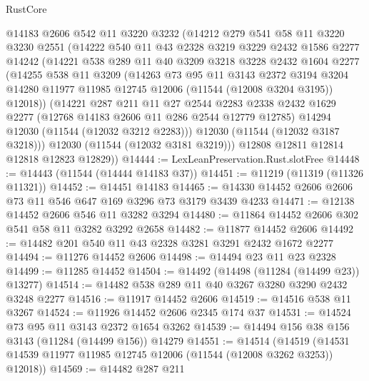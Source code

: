\begin{lexlean}{RustCore}
\begin{coremodule}
      @14183
      @2606
      @542
      @11
      @3220
      @3232
      (@14212
        @279
        @541
        @58
        @11
        @3220
        @3230
        @2551
        (@14222
          @540
          @11
          @43
          @2328
          @3219
          @3229
          @2432
          @1586
          @2277
          @14242
          (@14221
            @538
            @289
            @11
            @40
            @3209
            @3218
            @3228
            @2432
            @1604
            @2277
            (@14255
              @538
              @11
              @3209
              (@14263
                @73
                @95
                @11
                @3143
                @2372
                @3194
                @3204
                @14280
                @11977
                @11985
                @12745
                @12006
                (@11544 (@12008 @3204 @3195))
                @12018))
            (@14221
              @287
              @211
              @11
              @27
              @2544
              @2283
              @2338
              @2432
              @1629
              @2277
              (@12768 @14183 @2606 @11 @286 @2544 @12779 @12785)
              @14294
              @12030
              (@11544 (@12032 @3212 @2283)))
            @12030
            (@11544 (@12032 @3187 @3218)))
          @12030
          (@11544 (@12032 @3181 @3219)))
        @12808
        @12811
        @12814
        @12818
        @12823
        @12829))
@14444 := LexLeanPreservation.Rust.slotFree
@14448 := @14443 (@11544 (@14444 @14183 @37))
@14451 := @11219 (@11319 (@11326 @11321))
@14452 := @14451 @14183
@14465 := @14330 @14452 @2606 @2606 @73 @11 @546 @647 @169 @3296 @73 @3179 @3439 @4233
@14471 := @12138 @14452 @2606 @546 @11 @3282 @3294
@14480 := @11864 @14452 @2606 @302 @541 @58 @11 @3282 @3292 @2658
@14482 := @11877 @14452 @2606
@14492 := @14482 @201 @540 @11 @43 @2328 @3281 @3291 @2432 @1672 @2277
@14494 := @11276 @14452 @2606
@14498 := @14494 @23 @11 @23 @2328
@14499 := @11285 @14452
@14504 := @14492 (@14498 (@11284 (@14499 @23)) @13277)
@14514 := @14482 @538 @289 @11 @40 @3267 @3280 @3290 @2432 @3248 @2277
@14516 := @11917 @14452 @2606
@14519 := @14516 @538 @11 @3267
@14524 := @11926 @14452 @2606 @2345 @174 @37
@14531 := @14524 @73 @95 @11 @3143 @2372 @1654 @3262
@14539 := @14494 @156 @38 @156 @3143 (@11284 (@14499 @156)) @14279
@14551 := @14514
    (@14519 (@14531 @14539 @11977 @11985 @12745 @12006 (@11544 (@12008 @3262 @3253)) @12018))
@14569 := @14482
    @287
    @211

\end{coremodule}
\end{lexlean}
